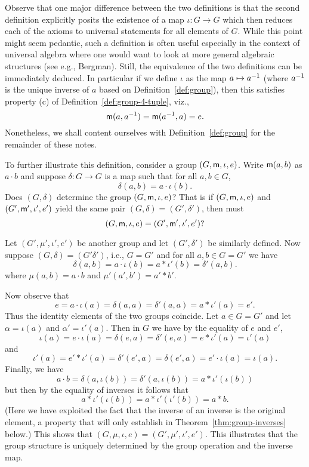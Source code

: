 Observe that one major difference between the two definitions is that the second
definition explicitly posits the existence of a map \(\iota: G \to G\) which
then reduces each of the axioms to universal statements for all elements of
\(G\). While this point might seem pedantic, such a definition is often useful
especially in the context of universal algebra where one would want to look at
more general algebraic structures (see e.g., Bergman). Still, the equivalence of
the two definitions can be immediately deduced. In particular if we define
\(\iota\) as the map \(a \mapsto a^{-1}\) (where \(a^{-1}\) is the unique inverse
of \(a\) based on Definition~\ref{def:group}), then this satisfies property (c)
of Definition~\ref{def:group-4-tuple}, viz.,
\[
    {\mathsf{m}}(a, a^{-1}) = {\mathsf{m}}(a^{-1}, a) = e.
\]
Nonetheless, we shall content ourselves with Definition~\ref{def:group} for the
remainder of these notes.

To further illustrate this definition, consider a group \((G, {\mathsf{m}}, \iota,
e)\). Write \({\mathsf{m}}(a,b)\) as \(a\cdot b\) and suppose \(\delta : G \to G\) is a
map such that for all \(a, b \in G\),
\[
    \delta(a, b) = a\cdot\iota(b).
\]
Does \((G, \delta)\) determine the group \((G, {\mathsf{m}}, \iota, e)\)? That is if
\((G, {\mathsf{m}}, \iota, e)\) and \((G', {\mathsf{m}}', \iota', e')\) yield the same pair
\((G, \delta) = (G', \delta')\), then must
\[(G, {\mathsf{m}}, \iota, e) = (G', {\mathsf{m}}', \iota', e')?\]

Let \((G', \mu', \iota', e')\) be another group and let \((G', \delta')\) be
similarly defined. Now suppose \((G, \delta) = (G' \delta')\), i.e., \(G = G'\)
and for all \(a, b \in G = G'\) we have
\[
\delta(a, b) = a \cdot \iota(b) = a * \iota'(b) = \delta'(a, b).
\]
where \(\mu(a, b) = a \cdot b\) and \(\mu'(a', b') = a' * b'\).

Now observe that
\[
e = a \cdot \iota(a) = \delta(a, a) = \delta'(a, a) = a * \iota'(a) = e'.
\]
Thus the identity elements of the two groups coincide. Let \(a \in G = G'\) and
let \(\alpha = \iota(a)\) and \(\alpha' = \iota'(a)\). Then in \(G\) we have by
the equality of \(e\) and \(e'\),
\[
\iota(a) = e \cdot \iota(a) = \delta(e, a) = \delta'(e, a) = e * \iota'(a) = \iota'(a)
\]
and
\[
 \iota'(a) = e' * \iota'(a) = \delta'(e', a) = \delta(e',a) = e' \cdot \iota(a) = \iota(a).
\]
Finally, we have
\[
a \cdot b = \delta(a, \iota(b)) = \delta'(a, \iota(b)) = a * \iota'(\iota(b))
\]
but then by the equality of inverses it follows that
\[
 a * \iota'(\iota(b)) = a * \iota'(\iota'(b)) = a * b.
\]
(Here we have exploited the fact that the inverse of an inverse is the original
element, a property that will only establish in Theorem~\ref{thm:group-inverses}
below.) This shows that \((G, \mu, \iota, e) = (G', \mu', \iota', e')\). This
illustrates that the group structure is uniquely determined by the group
operation and the inverse map.


